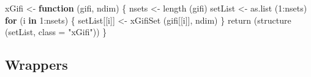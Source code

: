 \documentclass[
  12pt,
]{book}
\newenvironment{Shaded}{\begin{snugshade}}{\end{snugshade}}
\newcommand{\AttributeTok}[1]{\textcolor[rgb]{0.77,0.63,0.00}{#1}}
\newcommand{\ControlFlowTok}[1]{\textcolor[rgb]{0.13,0.29,0.53}{\textbf{#1}}}
\newcommand{\DecValTok}[1]{\textcolor[rgb]{0.00,0.00,0.81}{#1}}
\newcommand{\FunctionTok}[1]{\textcolor[rgb]{0.00,0.00,0.00}{#1}}
\newcommand{\NormalTok}[1]{#1}
\newcommand{\OtherTok}[1]{\textcolor[rgb]{0.56,0.35,0.01}{#1}}
\newcommand{\SpecialCharTok}[1]{\textcolor[rgb]{0.00,0.00,0.00}{#1}}
\newcommand{\StringTok}[1]{\textcolor[rgb]{0.31,0.60,0.02}{#1}}
\begin{document}
\begin{Shaded}
\begin{Highlighting}[]
\NormalTok{xGifi }\OtherTok{\textless{}{-}} \ControlFlowTok{function}\NormalTok{ (gifi, ndim) \{}
\NormalTok{  nsets }\OtherTok{\textless{}{-}} \FunctionTok{length}\NormalTok{ (gifi)}
\NormalTok{  setList }\OtherTok{\textless{}{-}} \FunctionTok{as.list}\NormalTok{ (}\DecValTok{1}\SpecialCharTok{:}\NormalTok{nsets)}
  \ControlFlowTok{for}\NormalTok{ (i }\ControlFlowTok{in} \DecValTok{1}\SpecialCharTok{:}\NormalTok{nsets) \{}
\NormalTok{    setList[[i]] }\OtherTok{\textless{}{-}} \FunctionTok{xGifiSet}\NormalTok{ (gifi[[i]], ndim)}
\NormalTok{  \}}
  \FunctionTok{return}\NormalTok{ (}\FunctionTok{structure}\NormalTok{ (setList, }\AttributeTok{class =} \StringTok{"xGifi"}\NormalTok{))}
\NormalTok{\}}
\end{Highlighting}
\end{Shaded}

\hypertarget{wrappers-1}{%
\subsection{Wrappers}\label{wrappers-1}}
\end{document}
